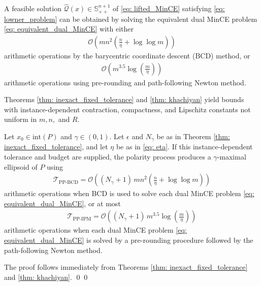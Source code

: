 \documentclass[smallextended]{svjour3}
\let\springerproof\proof
\let\endspringerproof\endproof
\renewenvironment{proof}{\springerproof}{%
  \ifhmode\qed\else\leavevmode\qed\fi\endspringerproof}
\newcommand{\wh}{\widehat}
\renewcommand{\S}{\mathbb{S}}
\begin{document}
\begin{theorem}{\cite[Theorems 3 and 4]{khachiyan1996rounding}}\label{thm: khachiyan}
    A feasible solution $\wh{\mathcal{Q}}(x) \in \S^{n+1}_{++}$ of \eqref{eq: lifted_MinCE} satisfying \eqref{eq: lowner_problem} can be obtained by solving the equivalent dual MinCE
    problem \eqref{eq: equivalent_dual_MinCE} with either
    \begin{align}
        \mathcal{O}\left(mn^2 \left(\frac{n}{\eta} + \log \log m \right) \right)
    \end{align}
    arithmetic operations by the barycentric coordinate descent (BCD) method, or
     \begin{align}
        \mathcal{O}\left( m^{3.5} \log \left(\frac{m}{\eta}\right)\right)
    \end{align}
    arithmetic operations using pre-rounding and path-following Newton method.
\end{theorem}

Theorems \ref{thm: inexact_fixed_tolerance} and \ref{thm: khachiyan} yield
bounds with instance-dependent contraction, compactness, and Lipschitz
constants not uniform in $m,n,$ and $R$.
\begin{theorem}\label{thm: overall_arithmetic_complexity}
    Let $x_0\in \mathrm{int}(P)$ and $\gamma\in (0,1)$. Let $\epsilon$ and $N_\gamma$ be as in Theorem \ref{thm: inexact_fixed_tolerance}, and let $\eta$ be as in \eqref{eq: eta}.
    If this instance-dependent tolerance and budget are supplied, the polarity
    process produces a $\gamma$-maximal ellipsoid of $P$ using
    \begin{align*}
        \mathcal{T}_{\text{PP-BCD}} =
        \mathcal{O}\left(
             (N_\gamma+1)\, mn^2
            \left(
                \frac{n}{\eta} + \log\log m
            \right)
        \right)
    \end{align*}
    arithmetic operations when BCD is used to solve each dual MinCE problem \eqref{eq: equivalent_dual_MinCE}, or at most
    \begin{align*}
        \mathcal{T}_{\text{PP-IPM}} =  \mathcal{O}\left(
            (N_\gamma+1)\, m^{3.5}\log\left(\frac{m}{\eta}\right)
        \right)
        \label{eq: overall_arithmetic_complexity_newton}
    \end{align*}
    arithmetic operations when each dual MinCE problem \eqref{eq: equivalent_dual_MinCE} is solved by a pre-rounding procedure followed by the path-following Newton method.
\end{theorem}
\begin{proof}
    The proof follows immediately from Theorems \ref{thm: inexact_fixed_tolerance} and \ref{thm: khachiyan}.
\end{proof}
\end{document}
